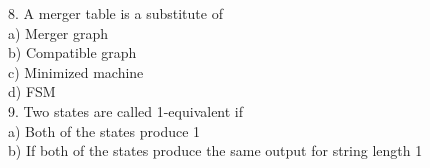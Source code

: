 \documentclass[8pt]{beamer}
\begin{document}
\begin{frame}
\begin{multicols}{2}
\vspace*{0.3cm}
8. A merger table is a substitute of\\
\hspace*{0.4cm} a) Merger graph\\
\hspace*{0.4cm} b) Compatible graph\\
\hspace*{0.4cm} c) Minimized machine\\
\hspace*{0.4cm} d) FSM\\

\vspace*{0.3cm}
9. Two states are called 1-equivalent if\\
\hspace*{0.4cm} a) Both of the states produce 1\\
\hspace*{0.4cm} b) If both of the states produce the same
output for string length 1\\
\end{multicols}
\end{frame}
\end{document}
